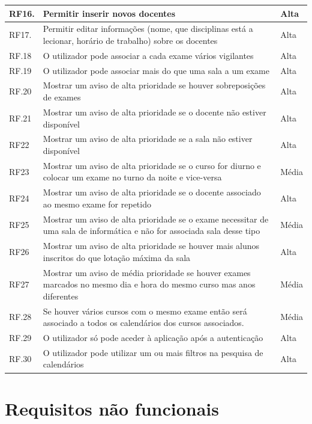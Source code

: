 \documentclass[11pt, twoside]{report}
\begin{document}
\begin{center}
\begin{longtable}{|m{1cm}|m{12cm}|m{2cm}|}
			\hline
			RF16. & Permitir inserir novos docentes & Alta\\
			\hline
			RF17. & Permitir editar informações (nome, que disciplinas está a lecionar, horário de trabalho) sobre os docentes & Alta\\
			\hline
			RF.18 &O utilizador pode associar a cada exame vários vigilantes & Alta\\
			\hline
			 \endfirsthead
			RF.19 &	O utilizador pode associar mais do que uma sala a um exame & Alta\\
			\hline
			RF.20 &Mostrar um aviso de alta prioridade se houver sobreposições de exames & Alta\\
			\hline
			RF.21 & Mostrar um aviso de alta prioridade se o docente não estiver disponível & Alta \\
			\hline
			RF22 & Mostrar um aviso de alta prioridade se a sala não estiver disponível & Alta\\
			\hline
			RF23 & Mostrar um aviso de alta prioridade se o curso for diurno e colocar um exame no turno da noite e vice-versa & Média\\
			\hline
			RF24&Mostrar um aviso de alta prioridade se o docente associado ao mesmo exame for repetido & Alta \\
			\hline
			RF25 & Mostrar um aviso de alta prioridade se o exame necessitar de uma sala de informática e não for associada sala desse tipo & Média\\
			\hline
			RF26 & Mostrar um aviso de alta prioridade se houver mais alunos inscritos do que  lotação máxima da sala & Alta\\
			\hline
			RF27 & Mostrar um aviso de média prioridade se houver exames marcados no mesmo dia e hora do mesmo curso mas anos diferentes & Média\\
			\hline
			RF.28 & Se houver vários cursos com o mesmo exame então será associado a todos os calendários dos cursos associados. & Média\\
			\hline
			RF.29 & O utilizador só pode aceder à aplicação após a autenticação & Alta\\
			\hline
			RF.30 & O utilizador pode utilizar um ou mais filtros na pesquisa de calendários & Alta\\
			\hline
		\end{longtable}
	\end{center}



	
	\section{Requisitos não funcionais}
\end{document}
